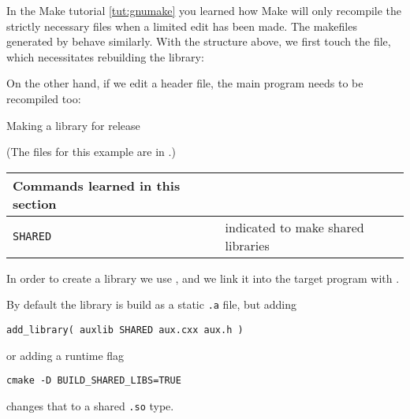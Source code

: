 In the Make tutorial \ref{tut:gnumake} you learned how Make will only recompile
the strictly necessary files when a limited edit has been made.
The makefiles generated by  behave similarly.
With the structure above, we first touch the  file,
which necessitates rebuilding the library:
%


On the other hand, if we edit a header file, the main program
needs to be recompiled too:
%


 {Making a library for release}
\label{sec:cmake-public-lib}

(The files for this example are in .)

\begin{tabular}{lp{3in}}
  \toprule
  Commands learned in this section\\
  \midrule
  \lstinline+SHARED+&indicated to make shared libraries\\
  \bottomrule
\end{tabular}

\begin{floatingfigure}[r]{2.5in}
  \begin{minipage}{2.5in}
  \end{minipage}
\end{floatingfigure}
%
In order to create a library we use ,
and we link it into the target program with .

By default the library is build as a static \texttt{.a} file,
but adding
\begin{lstlisting}
add_library( auxlib SHARED aux.cxx aux.h )
\end{lstlisting}
or adding a runtime flag
\begin{verbatim}
cmake -D BUILD_SHARED_LIBS=TRUE
\end{verbatim}
changes that to a shared \texttt{.so} type.

